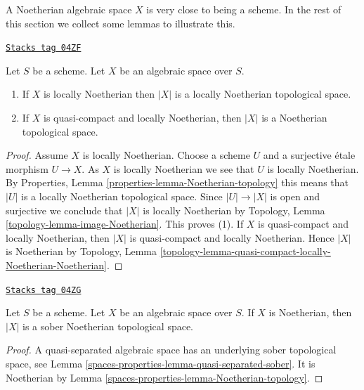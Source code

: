\medskip\noindent
A Noetherian algebraic space $X$ is very close to being a scheme.
In the rest of this section we collect some lemmas to illustrate this.

\begin{lemma}
\label{spaces-properties-lemma-Noetherian-topology}
\href{https://stacks.math.columbia.edu/tag/04ZF}{\texttt{Stacks tag 04ZF}}

Let $S$ be a scheme. Let $X$ be an algebraic space over $S$.
\begin{enumerate}
\item If $X$ is locally Noetherian then $|X|$ is a locally Noetherian
topological space.
\item If $X$ is quasi-compact and locally Noetherian, then $|X|$
is a Noetherian topological space.
\end{enumerate}
\end{lemma}

\begin{proof}
Assume $X$ is locally Noetherian.
Choose a scheme $U$ and a surjective \'etale morphism
$U \to X$. As $X$ is locally Noetherian we see that $U$ is locally
Noetherian. By
Properties, Lemma \ref{properties-lemma-Noetherian-topology}
this means that $|U|$ is a locally Noetherian topological space.
Since $|U| \to |X|$ is open and surjective we conclude that
$|X|$ is locally Noetherian by
Topology, Lemma \ref{topology-lemma-image-Noetherian}.
This proves (1). If $X$ is quasi-compact and locally Noetherian,
then $|X|$ is quasi-compact and locally Noetherian. Hence $|X|$
is Noetherian by
Topology,
Lemma \ref{topology-lemma-quasi-compact-locally-Noetherian-Noetherian}.
\end{proof}

\begin{lemma}
\label{spaces-properties-lemma-Noetherian-sober}
\href{https://stacks.math.columbia.edu/tag/04ZG}{\texttt{Stacks tag 04ZG}}

Let $S$ be a scheme. Let $X$ be an algebraic space over $S$.
If $X$ is Noetherian, then $|X|$ is a sober Noetherian topological space.
\end{lemma}

\begin{proof}
A quasi-separated algebraic space has an underlying sober topological
space, see
Lemma \ref{spaces-properties-lemma-quasi-separated-sober}.
It is Noetherian by
Lemma \ref{spaces-properties-lemma-Noetherian-topology}.
\end{proof}

